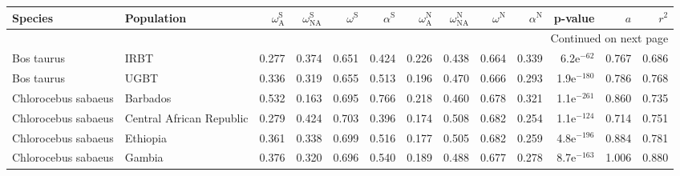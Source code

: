 \begin{longtable}{llrrrrrrrrrrr}
\toprule
             Species &                Population & $\omega_{\textrm{A}}^{\textrm{S}}$ & $\omega_{\textrm{NA}}^{\textrm{S}}$ & $\omega^{\textrm{S}}$ & $\alpha^{\textrm{S}}$ & $\omega_{\textrm{A}}^{\textrm{N}}$ & $\omega_{\textrm{NA}}^{\textrm{N}}$ & $\omega^{\textrm{N}}$ & $\alpha^{\textrm{N}}$ &       p-value &    $a$ &  $r^2$ \\
\midrule
\endhead
\midrule
\multicolumn{13}{r}{{Continued on next page}} \\
\midrule
\endfoot

\bottomrule
\endlastfoot
          Bos taurus &                      IRBT &                              0.277 &                               0.374 &                 0.651 &                 0.424 &                              0.226 &                               0.438 &                 0.664 &                 0.339 &  6.2e$^{-62}$ &  0.767 &  0.686 \\
          Bos taurus &                      UGBT &                              0.336 &                               0.319 &                 0.655 &                 0.513 &                              0.196 &                               0.470 &                 0.666 &                 0.293 & 1.9e$^{-180}$ &  0.786 &  0.768 \\
 Chlorocebus sabaeus &                  Barbados &                              0.532 &                               0.163 &                 0.695 &                 0.766 &                              0.218 &                               0.460 &                 0.678 &                 0.321 & 1.1e$^{-261}$ &  0.860 &  0.735 \\
 Chlorocebus sabaeus &  Central African Republic &                              0.279 &                               0.424 &                 0.703 &                 0.396 &                              0.174 &                               0.508 &                 0.682 &                 0.254 & 1.1e$^{-124}$ &  0.714 &  0.751 \\
 Chlorocebus sabaeus &                  Ethiopia &                              0.361 &                               0.338 &                 0.699 &                 0.516 &                              0.177 &                               0.505 &                 0.682 &                 0.259 & 4.8e$^{-196}$ &  0.884 &  0.781 \\
 Chlorocebus sabaeus &                    Gambia &                              0.376 &                               0.320 &                 0.696 &                 0.540 &                              0.189 &                               0.488 &                 0.677 &                 0.278 & 8.7e$^{-163}$ &  1.006 &  0.880 \\

\end{longtable}

